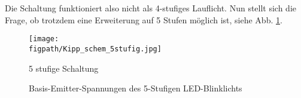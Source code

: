 Die Schaltung funktioniert also nicht als 4-stufiges Lauflicht. Nun stellt sich die Frage, ob trotzdem eine Erweiterung auf 5 Stufen möglich ist, siehe Abb. \ref{fig_Kap3_14:5stufig}.

\begin{figure}[H]
    \centering
    \texttt{[image: \\figpath/Kipp\_schem\_5stufig.jpg]}
    \caption{5 stufige Schaltung}
    \label{fig_Kap3_14:5stufig}
\end{figure}

\begin{figure}[H]
	\centering \small
	\scalebox{0.9}{}
	\caption{Basis-Emitter-Spannungen des 5-Stufigen LED-Blinklichts}
	\label{fig_Kap3_15:Spannungen}
\end{figure}